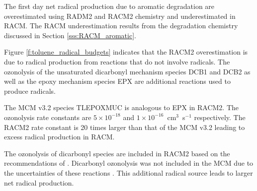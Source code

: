 The first day net radical production due to aromatic degradation are overestimated using RADM2 and RACM2 chemistry and underestimated in RACM. 
The RACM underestimation results from the degradation chemistry discussed in Section \ref{sss:RACM_aromatic}.

Figure \ref{f:toluene_radical_budgets} indicates that the RACM2 overestimation is due to radical production from reactions that do not involve radicals. 
The ozonolysis of the unsaturated dicarbonyl mechanism species DCB1 and DCB2 as well as the epoxy mechanism species EPX are additional reactions used to produce radicals.

The MCM v3.2 species TLEPOXMUC is analogous to EPX in RACM2. 
The ozonolysis rate constants are \mbox{$5 \times 10^{-18}$} and \mbox{$1 \times 10^{-16}$ cm$^3$ s$^{-1}$} respectively. 
The RACM2 rate constant is 20 times larger than that of the MCM v3.2 leading to excess radical production in RACM.

The ozonolysis of dicarbonyl species are included in RACM2 based on the recommendations of \citet{Bierbach:1994}. 
Dicarbonyl ozonolysis was not included in the MCM due to the uncertainties of these reactions \citep{Bloss:2005}.  
This additional radical source leads to larger net radical production.

